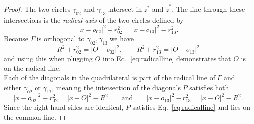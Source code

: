 \documentclass[10pt,a4paper]{amsart}
\begin{document}
\begin{proof}
The two circles $\gamma_{02}$ and $\gamma_{13}$ intersect in $z^*$ and $\tilde z^*$. The line through these intersections is the \emph{radical axis} of the two circles defined by 
\begin{equation}\label{eq:radicalline}
    |x-o_{02}|^2 - r_{02}^2 = |x-o_{13}|^2 - r_{13}^2.
\end{equation}
Because $\Gamma$ is orthogonal to $\gamma_{02},\gamma_{13}$ we have
\begin{equation}
    R^2+r_{02}^2 = |O-o_{02}|^2,
    \qquad
    R^2+r_{13}^2 = |O-o_{13}|^2    
\end{equation}
and using this when plugging $O$ into Eq.~\ref{eq:radicalline} demonstrates that $O$ is on the radical line.\\
Each of the diagonals in the quadrilateral is part of the radical line of  $\Gamma$ and either $\gamma_{02}$ or $\gamma_{13}$, meaning the intersection of the diagonals $P$ satisfies both
\begin{equation}
    |x-o_{02}|^2 - r_{02}^2 = |x-O|^2 - R^2
    \qquad \text{and}
    \qquad
    |x-o_{13}|^2 - r_{13}^2 = |x-O|^2 - R^2.  
\end{equation}
Since the right hand sides are identical, $P$ satisfies Eq.~\ref{eq:radicalline} and lies on the common line. 
\end{proof}
\end{document}
